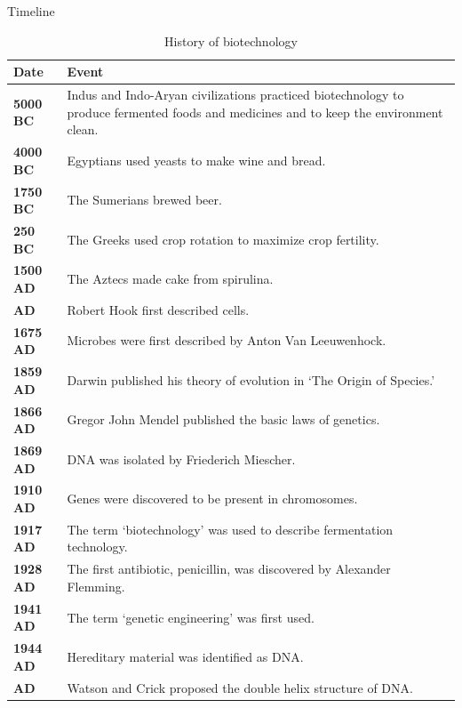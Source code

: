 \documentclass[ignorenonframetext,aspectratio=169]{beamer}
\begin{document}
\begin{frame}[allowframebreaks]{Timeline}
\protect\hypertarget{timeline}{}

\begin{table}[t]

\caption{\label{tab:biotechnology-history1}History of biotechnology}
\centering
\fontsize{5}{7}\selectfont
\begin{tabular}{>{\bfseries}l>{\raggedright\arraybackslash}p{40em}}
\toprule
Date & Event\\
\midrule
\rowcolor{gray!6}  5000 BC & Indus and Indo-Aryan civilizations practiced biotechnology to produce fermented foods and medicines and to keep the environment clean.\\
4000 BC & Egyptians used yeasts to make wine and bread.\\
\rowcolor{gray!6}  1750 BC & The Sumerians brewed beer.\\
250 BC & The Greeks used crop rotation to maximize crop fertility.\\
\rowcolor{gray!6}  1500 AD & The Aztecs made cake from spirulina.\\
\addlinespace
1663 AD & Robert Hook first described cells.\\
\rowcolor{gray!6}  1675 AD & Microbes were first described by Anton Van Leeuwenhock.\\
1859 AD & Darwin published his theory of evolution in ‘The Origin of Species.’\\
\rowcolor{gray!6}  1866 AD & Gregor John Mendel published the basic laws of genetics.\\
1869 AD & DNA was isolated by Friederich Miescher.\\
\addlinespace
\rowcolor{gray!6}  1910 AD & Genes were discovered to be present in chromosomes.\\
1917 AD & The term ‘biotechnology’ was used to describe fermentation technology.\\
\rowcolor{gray!6}  1928 AD & The first antibiotic, penicillin, was discovered by Alexander Flemming.\\
1941 AD & The term ‘genetic engineering’ was first used.\\
\rowcolor{gray!6}  1944 AD & Hereditary material was identified as DNA.\\
\addlinespace
1953 AD & Watson and Crick proposed the double helix structure of DNA.\\
\bottomrule
\end{tabular}
\end{table}

\end{frame}
\end{document}
